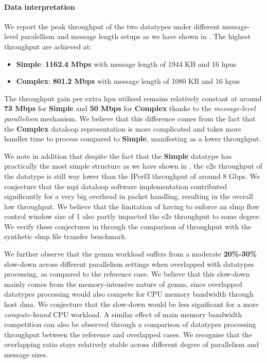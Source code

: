\paragraph{Data interpretation} We report the peak throughput of the two datatypes under different message-level paralellism and message length setups as we have shown in .  The highest throughput are achieved at:
\begin{itemize}
    \item \textbf{Simple}: \textbf{1162.4 Mbps} with message length of 1944 KB and 16 \ac{hpu}s
    \item \textbf{Complex}: \textbf{801.2 Mbps} with message length of 1080 KB and 16 \ac{hpu}s
\end{itemize}
The throughput gain per extra \ac{hpu} utilised remains relatively constant at around \textbf{73 Mbps} for \textbf{Simple} and \textbf{50 Mbps} for \textbf{Complex} thanks to the \emph{message-level parallelism} mechanism.  We believe that this difference comes from the fact that the \textbf{Complex} dataloop representation is more complicated and takes more handler time to process compared to \textbf{Simple}, manifesting as a lower throughput.

We note in addition that despite the fact that the \textbf{Simple} datatype has practically the most simple structure as we have shown in , the \ac{e2e} throughput of the datatype is still way lower than the IPerf3 throughput of around 8 Gbps.  We conjecture that the \ac{mpi} dataloop software implementation contributed significantly for a very big overhead in packet handling, resulting in the overall low throughput.  We believe that the limitation of having to enforce an \ac{slmp} flow control window size of 1 also partly impacted the \ac{e2e} throughput to some degree.  We verify these conjectures in  through the comparison of throughput with the synthetic \ac{slmp} file transfer benchmark.

We further observe that the \ac{gemm} workload suffers from a moderate \textbf{20\%-30\%} slow-down across different parallelism settings when overlapped with datatypes processing, as compared to the reference case.  We believe that this slow-down mainly comes from the memory-intensive nature of \ac{gemm}, since overlapped datatypes processing would also compete for CPU memory bandwidth through host \ac{dma}.  We conjecture that the slow-down would be less significant for a more \emph{compute-bound} CPU workload.  A similar effect of main memory bandwidth competition can also be observed through a comparison of datatypes processing throughput between the reference and overlapped cases.
We recognise that the overlapping ratio stays relatively stable across different degree of parallelism and message sizes.

